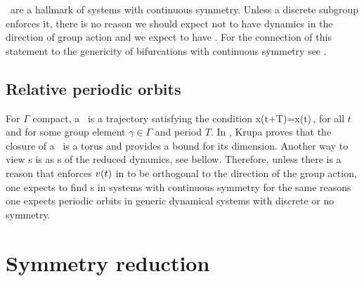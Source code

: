 \Reqva\ are a hallmark of systems with continuous symmetry. Unless a discrete subgroup
enforces it, there is no reason we should expect not to have dynamics in the direction of
group action and we expect to have \reqva. For the connection of this statement
to the genericity of bifurcations with continuous symmetry see .

\subsection{Relative periodic orbits}

For $\Gamma$ compact, a \rpo\ is a trajectory satisfying the condition
\beq
	x(t+T)=\gamma x(t)\,,
	\label{eq:rpoDef}
\eeq	
for all $t$ and for some group element $\gamma\in\Gamma$ and period $T$. In , Krupa proves
that the closure of a \rpo\ is a torus and provides a bound for its dimension. Another way to view
{\rpo s} is as {\po s} of the reduced dynamics, see  bellow. Therefore, unless there is
a reason that enforces $v(t)$ in  to be orthogonal to the direction of the group action,
one expects to find {\rpo s} in systems with continuous symmetry for the same reasons one expects periodic
orbits in generic dynamical systems with discrete or no symmetry.


\PublicPrivate{
    }{ %
At the other extreme let's define a generic trajectory (with respect to symmetry) to be one that has no
symmetry and thus lives in the principal stratum and has group-orbit type $\Gamma$. For finite groups there exists a family of $|\Gamma|$ (disconnected) copies of the solution. For compact groups there exists a manifold of solutions of dimension $\dim \Gamma$.
    } %


    \PublicPrivate{
    }{ %




\subsection{Equivariant bifurcation theory}

    } %



\section{Symmetry reduction}
\label{sec:symRed}

